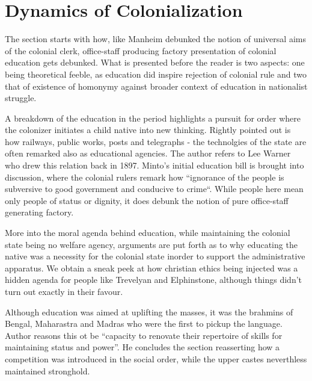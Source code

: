 \documentclass[a4paper]{article}
\begin{document}
\section{Dynamics of Colonialization}
    
    The section starts with how, like Manheim debunked
    the notion of universal aims of the colonial clerk,
    office-staff producing factory presentation of
    colonial education gets debunked. What is presented
    before the reader is two aspects: one being
    theoretical feeble, as education did inspire
    rejection of colonial rule and two that of existence
    of homonymy against broader context of education in
    nationalist struggle.

    A breakdown of the education in the period
    highlights a pursuit for order where the colonizer
    initiates a child native into new thinking. Rightly
    pointed out is how railways, public works, posts and
    telegraphs - the technolgies of the state are often
    remarked also as educational agencies. The author
    refers to Lee Warner who drew this relation back in
    1897. Minto's initial education bill is brought into
    discussion, where the colonial rulers remark how
    ``ignorance of the people is subversive to good
    government and conducive to crime``. While people
    here mean only people of status or dignity, it does
    debunk the notion of pure office-staff generating
    factory. 

    More into the moral agenda behind education, while
    maintaining the colonial state being no welfare
    agency, arguments are put forth as to why educating
    the native was a necessity for the colonial state
    inorder to support the administrative apparatus. We
    obtain a sneak peek at how christian ethics being
    injected was a hidden agenda for people like
    Trevelyan and Elphinstone, although things didn't
    turn out exactly in their favour.

    Although education was aimed at uplifting the
    masses, it was the brahmins of Bengal, Maharastra
    and Madras who were the first to pickup the
    language. Author reasons this ot be ``capacity to
    renovate their repertoire of skills for maintaining
    status and power''. He concludes the section
    reasserting how a competition was introduced in the
    social order, while the upper castes neverthless
    maintained stronghold. 

\end{document}
